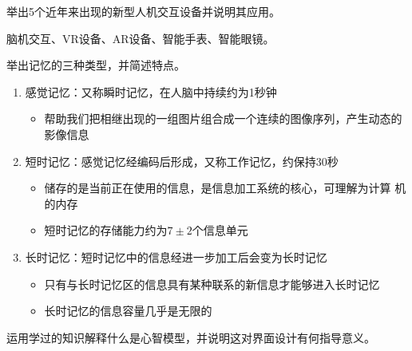 \begin{problem}[2015]
举出5个近年来出现的新型人机交互设备并说明其应用。
\end{problem}

\begin{solution}
脑机交互、VR设备、AR设备、智能手表、智能眼镜。
\end{solution}



\begin{problem}[2015]
举出记忆的三种类型，并简述特点。
\end{problem}

\begin{solution}
\begin{enumerate}[label=\arabic*.]
    \item 感觉记忆：又称瞬时记忆，在人脑中持续约为1秒钟
    \vspace{-0.25em}
    \begin{itemize}
        \item 帮助我们把相继出现的一组图片组合成一个连续的图像序列，产生动态的影像信息
    \end{itemize}
    \item 短时记忆：感觉记忆经编码后形成，又称工作记忆，约保持30秒
    \vspace{-0.25em}
    \begin{itemize}
        \item 储存的是当前正在使用的信息，是信息加工系统的核心，可理解为计算
        机的内存
        \item 短时记忆的存储能力约为$7 \pm 2$个信息单元
    \end{itemize}
    \item 长时记忆：短时记忆中的信息经进一步加工后会变为长时记忆
    \vspace{-0.25em}
    \begin{itemize}
        \item 只有与长时记忆区的信息具有某种联系的新信息才能够进入长时记忆
        \item 长时记忆的信息容量几乎是无限的
    \end{itemize}
\end{enumerate}
\end{solution}



\begin{problem}[2015、2016、2021]
运用学过的知识解释什么是心智模型，并说明这对界面设计有何指导意义。
\end{problem}

